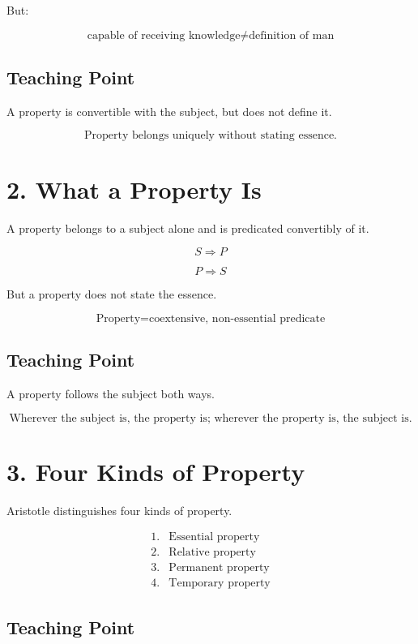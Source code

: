 \documentclass[12pt]{article}
\begin{document}
But:

\[
\text{capable of receiving knowledge} \neq \text{definition of man}
\]

\subsection*{Teaching Point}

A property is convertible with the subject, but does not define it.

\[
\boxed{
\text{Property belongs uniquely without stating essence.}
}
\]

\section*{2. What a Property Is}

A property belongs to a subject alone and is predicated convertibly of it.

\[
S \Rightarrow P
\]

\[
P \Rightarrow S
\]

But a property does not state the essence.

\[
\text{Property} = \text{coextensive, non-essential predicate}
\]

\subsection*{Teaching Point}

A property follows the subject both ways.

\[
\boxed{
\text{Wherever the subject is, the property is; wherever the property is, the subject is.}
}
\]

\section*{3. Four Kinds of Property}

Aristotle distinguishes four kinds of property.

\[
\begin{array}{ll}
1. & \text{Essential property} \\
2. & \text{Relative property} \\
3. & \text{Permanent property} \\
4. & \text{Temporary property}
\end{array}
\]

\subsection*{Teaching Point}
\end{document}
